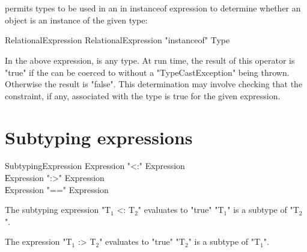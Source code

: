 
\section{}
\label{instanceOf}

\Xten{} permits types to be used in an in instanceof expression
to determine whether an object is an instance of the given type:

\begin{grammar}
RelationalExpression \: RelationalExpression \xcd"instanceof" Type
\end{grammar}

In the above expression,  is any type.
At run time, the result of this operator is
\xcd"true" if the  can be
coerced
to  without a \xcd"TypeCastException" being
thrown.  Otherwise the result is \xcd"false".
This determination may involve checking
that the
constraint, if any, associated with the type is true for the
given expression.

\section{Subtyping expressions}

\begin{grammar}
SubtypingExpression \: Expression \xcd"<:" Expression \\
                    \| Expression \xcd":>" Expression \\
                    \| Expression \xcd"==" Expression \\
\end{grammar}

The subtyping expression \xcdmath"T$_1$ <: T$_2$"
evaluates to  \xcd"true"  
                         \xcdmath"T$_1$"
                         is a subtype of
                         \xcdmath"T$_2$".

The expression \xcdmath"T$_1$ :> T$_2$"
evaluates to  \xcd"true"  
                         \xcdmath"T$_2$"
                         is a subtype of
                         \xcdmath"T$_1$".

